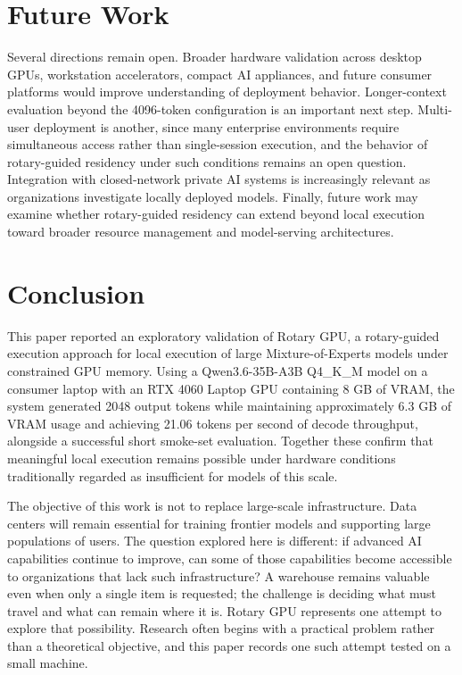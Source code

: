 \documentclass[11pt]{article}
\begin{document}
\section{Future Work}

Several directions remain open. Broader hardware validation across desktop GPUs, workstation accelerators, compact AI appliances, and future consumer platforms would improve understanding of deployment behavior. Longer-context evaluation beyond the 4096-token configuration is an important next step. Multi-user deployment is another, since many enterprise environments require simultaneous access rather than single-session execution, and the behavior of rotary-guided residency under such conditions remains an open question. Integration with closed-network private AI systems is increasingly relevant as organizations investigate locally deployed models. Finally, future work may examine whether rotary-guided residency can extend beyond local execution toward broader resource management and model-serving architectures.

\section{Conclusion}

This paper reported an exploratory validation of Rotary GPU, a rotary-guided execution approach for local execution of large Mixture-of-Experts models under constrained GPU memory. Using a Qwen3.6-35B-A3B Q4\_K\_M model on a consumer laptop with an RTX 4060 Laptop GPU containing 8 GB of VRAM, the system generated 2048 output tokens while maintaining approximately 6.3 GB of VRAM usage and achieving 21.06 tokens per second of decode throughput, alongside a successful short smoke-set evaluation. Together these confirm that meaningful local execution remains possible under hardware conditions traditionally regarded as insufficient for models of this scale.

The objective of this work is not to replace large-scale infrastructure. Data centers will remain essential for training frontier models and supporting large populations of users. The question explored here is different: if advanced AI capabilities continue to improve, can some of those capabilities become accessible to organizations that lack such infrastructure? A warehouse remains valuable even when only a single item is requested; the challenge is deciding what must travel and what can remain where it is. Rotary GPU represents one attempt to explore that possibility. Research often begins with a practical problem rather than a theoretical objective, and this paper records one such attempt tested on a small machine.
\end{document}
